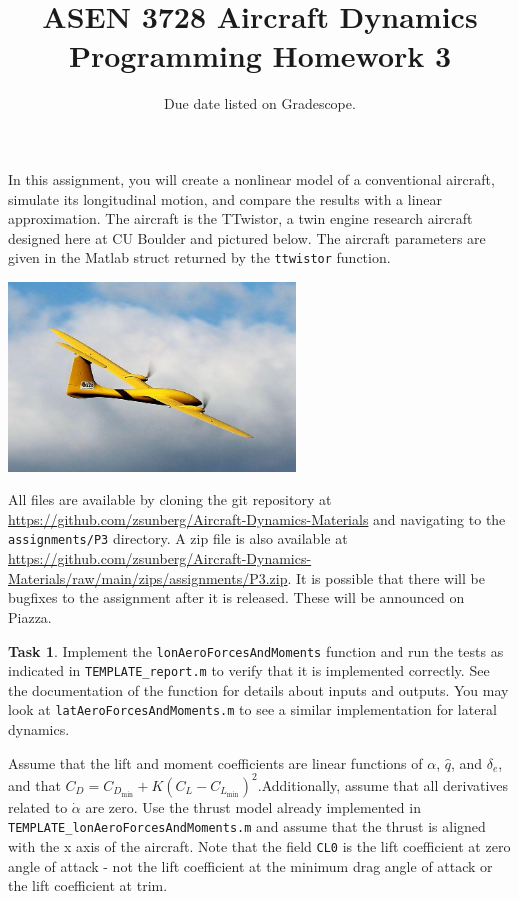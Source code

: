 \documentclass{article}
\title{ASEN 3728 Aircraft Dynamics\\Programming Homework 3}
\date{Due date listed on Gradescope.}
\theoremstyle{definition}
\newtheorem{task}{Task}
\begin{document}
\maketitle

In this assignment, you will create a nonlinear model of a conventional aircraft, simulate its longitudinal motion, and compare the results with a linear approximation.
The aircraft is the TTwistor, a twin engine research aircraft designed here at CU Boulder and pictured below. The aircraft parameters are given in the Matlab struct returned by the \texttt{ttwistor} function.

\begin{center}
\includegraphics[width=3in]{ttwistor.jpg}
\end{center}

All files are available by cloning the git repository at \url{https://github.com/zsunberg/Aircraft-Dynamics-Materials} and navigating to the \texttt{assignments/P3} directory. A zip file is also available at \url{https://github.com/zsunberg/Aircraft-Dynamics-Materials/raw/main/zips/assignments/P3.zip}. It is possible that there will be bugfixes to the assignment after it is released. These will be announced on Piazza.

\begin{task}
    Implement the \texttt{lonAeroForcesAndMoments} function and run the tests as indicated in \texttt{TEMPLATE\_report.m} to verify that it is implemented correctly. See the documentation of the function for details about inputs and outputs. You may look at \texttt{latAeroForcesAndMoments.m} to see a similar implementation for lateral dynamics.

    Assume that the lift and moment coefficients are linear functions of $\alpha$, $\hat{q}$, and $\delta_e$, and that $C_D = C_{D_\text{min}} + K (C_L - C_{L_\text{min}})^2$.Additionally, assume that all derivatives related to $\dot{\alpha}$ are zero. Use the thrust model already implemented in \texttt{TEMPLATE\_lonAeroForcesAndMoments.m} and assume that the thrust is aligned with the x axis of the aircraft. Note that the field \texttt{CL0} is the lift coefficient at zero angle of attack - not the lift coefficient at the minimum drag angle of attack or the lift coefficient at trim.
\end{task}
\end{document}
